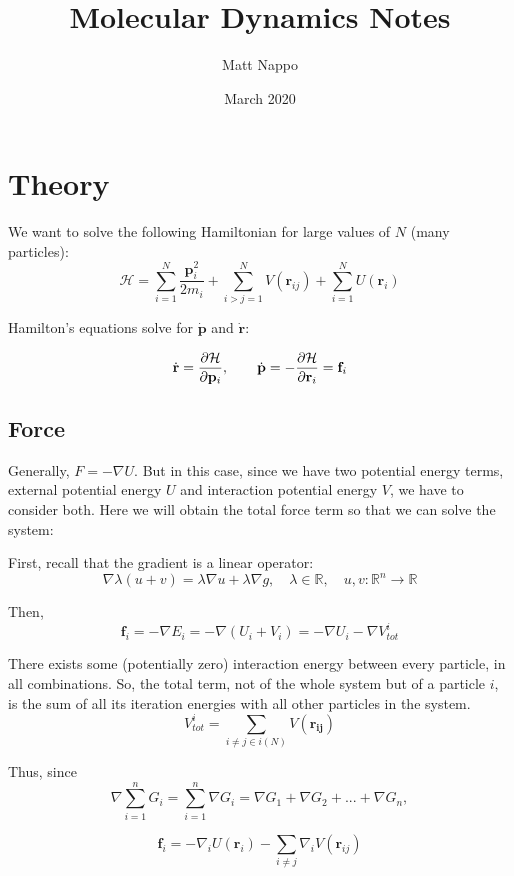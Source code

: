 \documentclass{article}
\title{Molecular Dynamics Notes}
\author{Matt Nappo}
\date{March 2020}
\begin{document}
\maketitle

\section{Theory}

We want to solve the following Hamiltonian for large values of $N$ (many particles):
\begin{equation}
    \mathcal{H} = \sum_{i=1}^N \frac{\mathbf{p}_i^2}{2m_i} + \sum_{i>j=1}^N V(\mathbf{r}_{ij}) + \sum_{i=1}^N U(\mathbf{r}_i)
\end{equation}

Hamilton's equations solve for $\dot{\mathbf{p}}$ and $\dot{\mathbf{r}}$:

\begin{equation}
    \dot{\mathbf{r}} = \pdv{\mathcal{H}}{\mathbf{p}_i}, \qquad \dot{\mathbf{p}} = -\pdv{\mathcal{H}}{\mathbf{r}_i} = \mathbf{f}_i
\end{equation}

\subsection{Force}

Generally, $F=-\nabla U$. But in this case, since we have two potential energy terms, external potential energy $U$ and interaction potential energy $V$, we have to consider both. Here we will obtain the total force term so that we can solve the system:

First, recall that the gradient is a linear operator: $$\nabla \lambda(u+v) = \lambda \nabla u + \lambda \nabla g, \quad \lambda \in \mathbb{R}, \quad u, v: \mathbb{R}^n \rightarrow \mathbb{R}$$

Then, $$\mathbf{f}_i = -\nabla E_i = -\nabla (U_i + V_i) = -\nabla U_i - \nabla V_{tot}^i$$

There exists some (potentially zero) interaction energy between every particle, in all combinations. So, the total term, not of the whole system but of a particle $i$, is the sum of all its iteration energies with all other particles in the system. $$V_{tot}^i = \sum_{i \neq j \in i(N)} V(\mathbf{r_{ij}})$$

Thus, since $$\nabla \sum_{i=1}^n G_i = \sum_{i=1}^n \nabla G_i = \nabla G_1 + \nabla G_2 + ... + \nabla G_n,$$

\begin{equation}
    \mathbf{f}_i = -\nabla_i U(\mathbf{r}_i) - \sum_{i \neq j} \nabla_i V(\mathbf{r}_{ij})
\end{equation}
\end{document}
